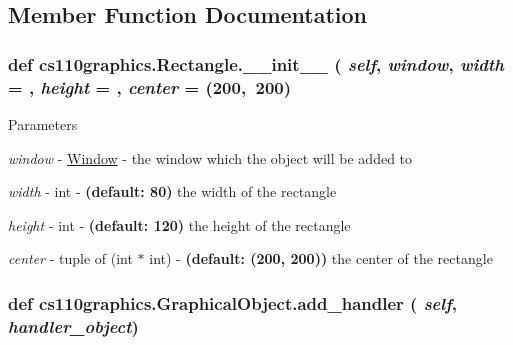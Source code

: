 \subsection{Member Function Documentation}
\hypertarget{classcs110graphics_1_1Rectangle_a57049aac9a7f4aa8823112290888a6a8}{
\subsubsection[{\_\-\_\-init\_\-\_\-}]{\setlength{\rightskip}{0pt plus 5cm}def cs110graphics.Rectangle.\_\-\_\-init\_\-\_\- ( {\em self}, \/   {\em window}, \/   {\em width} = {}, \/   {\em height} = {}, \/   {\em center} = {\ttfamily (200,~200})}}
\label{classcs110graphics_1_1Rectangle_a57049aac9a7f4aa8823112290888a6a8}

\begin{DoxyParams}{Parameters}
\item[{\em window}]-\/ \hyperlink{classcs110graphics_1_1Window}{Window} -\/ the window which the object will be added to \item[{\em width}]-\/ int -\/ {\bfseries (default: 80)} the width of the rectangle \item[{\em height}]-\/ int -\/ {\bfseries (default: 120)} the height of the rectangle \item[{\em center}]-\/ tuple of (int $\ast$ int) -\/ {\bfseries (default: (200, 200))} the center of the rectangle \end{DoxyParams}
\hypertarget{classcs110graphics_1_1GraphicalObject_adb1af0d5a6baae3f9a08d21a3227c49f}{
\subsubsection[{add\_\-handler}]{\setlength{\rightskip}{0pt plus 5cm}def cs110graphics.GraphicalObject.add\_\-handler ( {\em self}, \/   {\em handler\_\-object})}}
\label{classcs110graphics_1_1GraphicalObject_adb1af0d5a6baae3f9a08d21a3227c49f}



